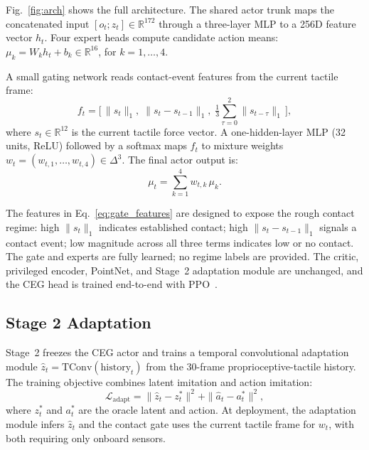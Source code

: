 \documentclass{article}
\begin{document}
Fig.~\ref{fig:arch} shows the full architecture. The shared actor trunk maps the concatenated
input $[o_t ; z_t] \in \mathbb{R}^{172}$ through a three-layer MLP to a 256D feature vector
$h_t$. Four expert heads compute candidate action means:
$\mu_k = W_k h_t + b_k \in \mathbb{R}^{16}$, for $k = 1,\ldots,4$.

A small gating network reads contact-event features from the current tactile frame:
\begin{equation}
  f_t = \bigl[\,\|s_t\|_1,\;\|s_t - s_{t-1}\|_1,\;\tfrac{1}{3}
  {\textstyle\sum_{\tau=0}^{2}} \|s_{t-\tau}\|_1\,\bigr],
  \label{eq:gate_features}
\end{equation}
where $s_t \in \mathbb{R}^{12}$ is the current tactile force vector. A one-hidden-layer MLP
(32 units, ReLU) followed by a softmax maps $f_t$ to mixture weights
$w_t = (w_{t,1},\ldots,w_{t,4}) \in \Delta^3$. The final actor output is:
\begin{equation}
  \mu_t = \sum_{k=1}^{4} w_{t,k}\,\mu_k.
  \label{eq:final_action}
\end{equation}

The features in Eq.~\ref{eq:gate_features} are designed to expose the rough contact regime:
high $\|s_t\|_1$ indicates established contact; high $\|s_t - s_{t-1}\|_1$ signals a contact
event; low magnitude across all three terms indicates low or no contact. The gate and experts
are fully learned; no regime labels are provided. The critic, privileged encoder, PointNet, and
Stage~2 adaptation module are unchanged, and the CEG head is trained end-to-end with
PPO~\citep{schulman2017}.

\subsection{Stage 2 Adaptation}

Stage~2 freezes the CEG actor and trains a temporal convolutional adaptation module
$\hat{z}_t = \text{TConv}(\text{history}_{t})$ from the 30-frame proprioceptive-tactile
history. The training objective combines latent imitation and action imitation:
\begin{equation}
  \mathcal{L}_\text{adapt} = \|\hat{z}_t - z_t^*\|^2 + \|\hat{a}_t - a_t^*\|^2,
  \label{eq:adapt_loss}
\end{equation}
where $z_t^*$ and $a_t^*$ are the oracle latent and action. At deployment, the adaptation
module infers $\hat{z}_t$ and the contact gate uses the current tactile frame for $w_t$, with
both requiring only onboard sensors.
\end{document}
